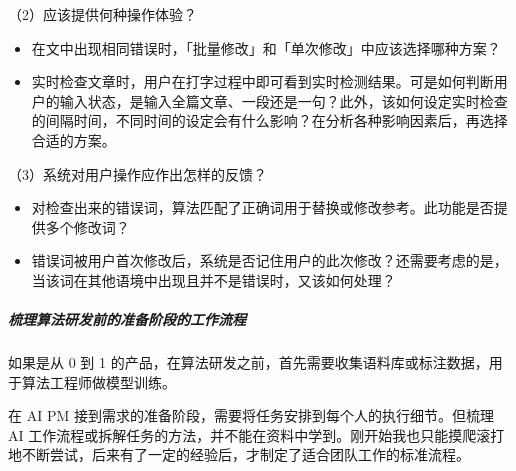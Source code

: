 \documentclass[letterpaper,11pt,english]{sphinxmanual}
\begin{document}
（2）应该提供何种操作体验？
\begin{itemize}
\item {} 
在文中出现相同错误时，「批量修改」和「单次修改」中应该选择哪种方案？

\item {} 
实时检查文章时，用户在打字过程中即可看到实时检测结果。可是如何判断用户的输入状态，是输入全篇文章、一段还是一句？此外，该如何设定实时检查的间隔时间，不同时间的设定会有什么影响？在分析各种影响因素后，再选择合适的方案。

\end{itemize}

（3）系统对用户操作应作出怎样的反馈？
\begin{itemize}
\item {} 
对检查出来的错误词，算法匹配了正确词用于替换或修改参考。此功能是否提供多个修改词？

\item {} 
错误词被用户首次修改后，系统是否记住用户的此次修改？还需要考虑的是，当该词在其他语境中出现且并不是错误时，又该如何处理？

\end{itemize}


\subparagraph{梳理算法研发前的准备阶段的工作流程}
\label{\detokenize{chapter_experience/recessive_work:id4}}
如果是从 0 到 1
的产品，在算法研发之前，首先需要收集语料库或标注数据，用于算法工程师做模型训练。

在 AI PM 接到需求的准备阶段，需要将任务安排到每个人的执行细节。但梳理 AI
工作流程或拆解任务的方法，并不能在资料中学到。刚开始我也只能摸爬滚打地不断尝试，后来有了一定的经验后，才制定了适合团队工作的标准流程。
\end{document}
